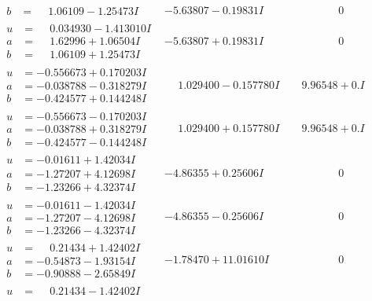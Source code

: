 \documentclass[1p]{elsarticle_modified}
\theoremstyle{definition}
\begin{document}
$$\begin{array}{c|c|c}
\begin{aligned}
b &= \phantom{-}1.06109 - 1.25473 I\end{aligned}
 & -5.63807 - 0.19831 I & \phantom{-0.000000 } 0 \\ \hline\begin{aligned}
u &= \phantom{-}0.034930 - 1.413010 I \\
a &= \phantom{-}1.62996 + 1.06504 I \\
b &= \phantom{-}1.06109 + 1.25473 I\end{aligned}
 & -5.63807 + 0.19831 I & \phantom{-0.000000 } 0 \\ \hline\begin{aligned}
u &= -0.556673 + 0.170203 I \\
a &= -0.038788 - 0.318279 I \\
b &= -0.424577 + 0.144248 I\end{aligned}
 & \phantom{-}1.029400 - 0.157780 I & \phantom{-}9.96548 + 0. I\phantom{ +0.000000I} \\ \hline\begin{aligned}
u &= -0.556673 - 0.170203 I \\
a &= -0.038788 + 0.318279 I \\
b &= -0.424577 - 0.144248 I\end{aligned}
 & \phantom{-}1.029400 + 0.157780 I & \phantom{-}9.96548 + 0. I\phantom{ +0.000000I} \\ \hline\begin{aligned}
u &= -0.01611 + 1.42034 I \\
a &= -1.27207 + 4.12698 I \\
b &= -1.23266 + 4.32374 I\end{aligned}
 & -4.86355 + 0.25606 I & \phantom{-0.000000 } 0 \\ \hline\begin{aligned}
u &= -0.01611 - 1.42034 I \\
a &= -1.27207 - 4.12698 I \\
b &= -1.23266 - 4.32374 I\end{aligned}
 & -4.86355 - 0.25606 I & \phantom{-0.000000 } 0 \\ \hline\begin{aligned}
u &= \phantom{-}0.21434 + 1.42402 I \\
a &= -0.54873 - 1.93154 I \\
b &= -0.90888 - 2.65849 I\end{aligned}
 & -1.78470 + 11.01610 I & \phantom{-0.000000 } 0 \\ \hline\begin{aligned}
u &= \phantom{-}0.21434 - 1.42402 I \\

\end{aligned}
\end{array}$$
\end{document}
